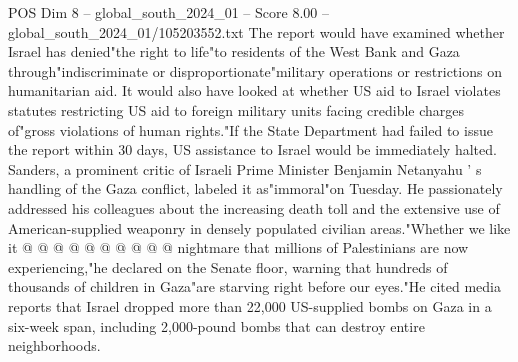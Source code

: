 \begin{textsample}{POS Dim 8 – global\_south\_2024\_01 – Score 8.00 – global\_south\_2024\_01/105203552.txt}
The report would have examined whether Israel has denied"the right to life"to residents of the West Bank and Gaza through"indiscriminate or disproportionate"military operations or restrictions on humanitarian aid.
It would also have looked at whether US aid to Israel violates statutes restricting US aid to foreign military units facing credible charges of"gross violations of human rights."If the State Department had failed to issue the report within 30 days, US assistance to Israel would be immediately halted.
Sanders, a prominent critic of Israeli Prime Minister Benjamin Netanyahu ' s handling of the Gaza conflict, labeled it as"immoral"on Tuesday.
He passionately addressed his colleagues about the increasing death toll and the extensive use of American-supplied weaponry in densely populated civilian areas."Whether we like it @ @ @ @ @ @ @ @ @ @ nightmare that millions of Palestinians are now experiencing,"he declared on the Senate floor, warning that hundreds of thousands of children in Gaza"are starving right before our eyes."He cited media reports that Israel dropped more than 22,000 US-supplied bombs on Gaza in a six-week span, including 2,000-pound bombs that can destroy entire neighborhoods.

\end{textsample}
